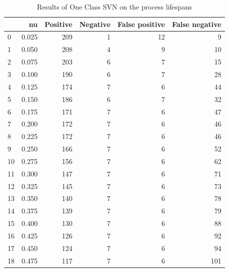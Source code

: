 \documentclass[a4paper,twoside,12pt]{book}
\begin{document}
\begin{appendices}

\begin{table}
	\centering
	\caption{Results of One Class SVN on the process lifespans}
	\label{id:tab:OCSVNlifespans}
	\begin{tabular}{lrrrrr}
		\toprule
		{} &     nu &  Positive &  Negative &  False positive &  False negative \\
		\midrule
		0  &  0.025 &       209 &         1 &              12 &               9 \\
		1  &  0.050 &       208 &         4 &               9 &              10 \\
		2  &  0.075 &       203 &         6 &               7 &              15 \\
		3  &  0.100 &       190 &         6 &               7 &              28 \\
		4  &  0.125 &       174 &         7 &               6 &              44 \\
		5  &  0.150 &       186 &         6 &               7 &              32 \\
		6  &  0.175 &       171 &         7 &               6 &              47 \\
		7  &  0.200 &       172 &         7 &               6 &              46 \\
		8  &  0.225 &       172 &         7 &               6 &              46 \\
		9  &  0.250 &       166 &         7 &               6 &              52 \\
		10 &  0.275 &       156 &         7 &               6 &              62 \\
		11 &  0.300 &       147 &         7 &               6 &              71 \\
		12 &  0.325 &       145 &         7 &               6 &              73 \\
		13 &  0.350 &       140 &         7 &               6 &              78 \\
		14 &  0.375 &       139 &         7 &               6 &              79 \\
		15 &  0.400 &       130 &         7 &               6 &              88 \\
		16 &  0.425 &       126 &         7 &               6 &              92 \\
		17 &  0.450 &       124 &         7 &               6 &              94 \\
		18 &  0.475 &       117 &         7 &               6 &             101 \\

\end{tabular}
\end{table}
\end{appendices}
\end{document}
